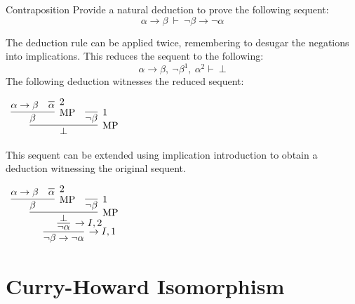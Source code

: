 \documentclass{book}
\begin{document}
    \begin{eg}{Contraposition}
        Provide a natural deduction to prove the following sequent: $$\alpha \to \beta \ \vdash \ \lnot\beta \to \lnot\alpha $$

        The deduction rule can be applied twice, remembering to desugar the negations into implications. This reduces the sequent to the following: $$\alpha \to \beta, \ \lnot\beta^{1}, \ \alpha^{2} \vdash \ \bot$$ The following deduction witnesses the reduced sequent: 

        \begin{center}
            $\begin{array}{c}
                \infer[\MP]{\bot}
                            {\infer[\MP]{\beta}
                                {\alpha \to \beta
                                &
                                \infer[2]{\alpha}{}}
                            &
                            \infer[1]{\lnot\beta}{}}
            \end{array}$
        \end{center}   
        
        This sequent can be extended using implication introduction to obtain a deduction witnessing the original sequent. 

        \begin{center}
            $\begin{array}{c}
                \infer[\to I,1]{\lnot\beta \to \lnot\alpha}
                    {\infer[\to I,2]{\lnot\alpha}
                        {\infer[\MP]{\bot}
                            {\infer[\MP]{\beta}
                                {\alpha \to \beta
                                &
                                \infer[2]{\alpha}{}}
                            &
                            \infer[1]{\lnot\beta}{}}}}
            \end{array}$
        \end{center}
    \end{eg}

    \newpage
    \section{Curry-Howard Isomorphism}
\end{document}
